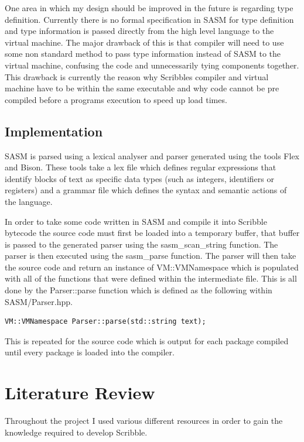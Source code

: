\documentclass[]{final_report}
\begin{document}
One area in which my design should be improved in the future is regarding type definition. Currently there is no formal specification in SASM for type definition and type information is passed directly from the high level language to the virtual machine. The major drawback of this is that compiler will need to use some non standard method to pass type information instead of SASM to the virtual machine, confusing the code and unnecessarily tying components together. This drawback is currently the reason why Scribbles compiler and virtual machine have to be within the same executable and why code cannot be pre compiled before a programs execution to speed up load times.

\section{Implementation}

SASM is parsed using a lexical analyser and parser generated using the tools Flex and Bison. These tools take a lex file which defines regular expressions that identify blocks of text as specific data types (such as integers, identifiers or registers) and a grammar file which defines the syntax and semantic actions of the language.

In order to take some code written in SASM and compile it into Scribble bytecode the source code must first be loaded into a temporary buffer, that buffer is passed to the generated parser using the sasm\_scan\_string function. The parser is then executed using the sasm\_parse function. The parser will then take the source code and return an instance of VM::VMNamespace which is populated with all of the functions that were defined within the intermediate file. This is all done by the Parser::parse function which is defined as the following within SASM/Parser.hpp.

\begin{verbatim}
VM::VMNamespace Parser::parse(std::string text);
\end{verbatim}

This is repeated for the source code which is output for each package compiled until every package is loaded into the compiler.

\chapter{Literature Review}

Throughout the project I used various different resources in order to gain the knowledge required to develop Scribble.
\end{document}
